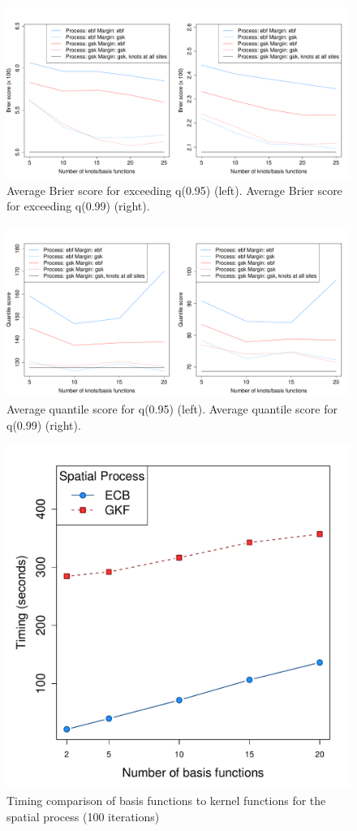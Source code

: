 \documentclass[11pt]{article}
\begin{document}
\begin{figure}  %
  \centering
  \includegraphics[width=\linewidth]{plots/fire-bs-mean}
  \caption{Average Brier score for exceeding q(0.95) (left). Average Brier score for exceeding q(0.99) (right).}
  \label{fig:avgqscore}
\end{figure}

\begin{figure}  %
	\centering
	\includegraphics[width=\linewidth]{plots/fire-qs-mean}
	\caption{Average quantile score for q(0.95) (left). Average quantile score for q(0.99) (right).}
  \label{fig:avgqscore}
\end{figure}

\begin{figure}  %
	\centering
	\includegraphics[width=0.47\linewidth]{plots/fire-timing}
	\caption{Timing comparison of basis functions to kernel functions for the spatial process (100 iterations)}
  \label{fig:timingcompare}
\end{figure}
\end{document}
